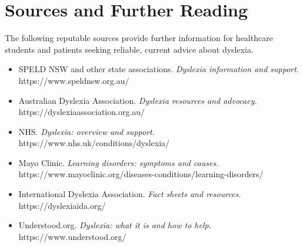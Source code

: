 \section*{Sources and Further Reading}
The following reputable sources provide further information for healthcare students and patients seeking reliable, current advice about dyslexia.
\begin{itemize}
    \item SPELD NSW and other state associations. \textit{Dyslexia information and support.} https://www.speldnsw.org.au/
    \item Australian Dyslexia Association. \textit{Dyslexia resources and advocacy.} https://dyslexiaassociation.org.au/
    \item NHS. \textit{Dyslexia: overview and support.} https://www.nhs.uk/conditions/dyslexia/
    \item Mayo Clinic. \textit{Learning disorders: symptoms and causes.} https://www.mayoclinic.org/diseases-conditions/learning-disorders/
    \item International Dyslexia Association. \textit{Fact sheets and resources.} https://dyslexiaida.org/
    \item Understood.org. \textit{Dyslexia: what it is and how to help.} https://www.understood.org/
\end{itemize}

